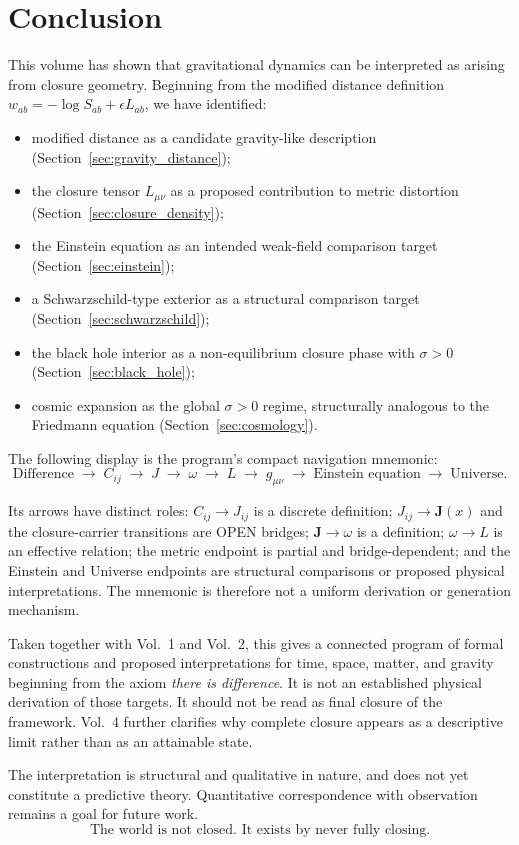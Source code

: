\section{Conclusion}
\label{sec:conclusion}

This volume has shown that gravitational dynamics can be interpreted as
arising from closure geometry.
Beginning from the modified distance definition
$w_{ab} = -\log S_{ab} + \epsilon L_{ab}$,
we have identified:

\begin{itemize}
  \item modified distance as a candidate gravity-like description
        (Section~\ref{sec:gravity_distance});
  \item the closure tensor $L_{\mu\nu}$ as a proposed contribution to metric distortion
        (Section~\ref{sec:closure_density});
  \item the Einstein equation as an intended weak-field comparison target
        (Section~\ref{sec:einstein});
  \item a Schwarzschild-type exterior as a structural comparison target
        (Section~\ref{sec:schwarzschild});
  \item the black hole interior as a non-equilibrium closure phase with $\sigma > 0$
        (Section~\ref{sec:black_hole});
  \item cosmic expansion as the global $\sigma > 0$ regime,
        structurally analogous to the Friedmann equation
        (Section~\ref{sec:cosmology}).
\end{itemize}

The following display is the program's compact navigation mnemonic:
\begin{equation}
  \text{Difference}
  \;\to\; C_{ij}
  \;\to\; J
  \;\to\; \omega
  \;\to\; L
  \;\to\; g_{\mu\nu}
  \;\to\; \text{Einstein equation}
  \;\to\; \text{Universe}.
\end{equation}

Its arrows have distinct roles: $C_{ij}\to J_{ij}$ is a discrete definition;
$J_{ij}\to\mathbf J(x)$ and the closure-carrier transitions are OPEN bridges;
$\mathbf J\to\omega$ is a definition; $\omega\to L$ is an effective relation;
the metric endpoint is partial and bridge-dependent; and the Einstein and
Universe endpoints are structural comparisons or proposed physical
interpretations.  The mnemonic is therefore not a uniform derivation or
generation mechanism.

Taken together with Vol.~1 and Vol.~2, this gives a connected program of formal
constructions and proposed interpretations for time, space, matter, and
gravity beginning from the axiom \emph{there is difference}.  It is not an
established physical derivation of those targets.
It should not be read as final closure of the framework.
Vol.~4 further clarifies why complete closure appears as a descriptive limit
rather than as an attainable state.

The interpretation is structural and qualitative in nature,
and does not yet constitute a predictive theory.
Quantitative correspondence with observation remains a goal for future work.
\begin{equation}
  \boxed{\text{The world is not closed. It exists by never fully closing.}}
\end{equation}
